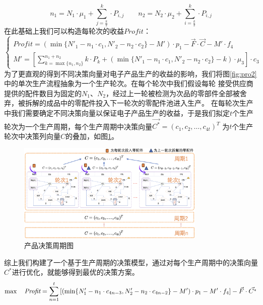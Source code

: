 \documentclass[withoutpreface,bwprint]{cumcmthesis} %
\begin{document}
\begin{equation}
	n_{1}=N_{1}\cdot \mu_{1}+\sum_{j=\frac{k}{2}}^{k}\cdot P_{i,j} \qquad
	n_{2}=N_{2}\cdot \mu_{2}+\sum_{i=\frac{k}{2}}^{k}\cdot P_{i,j}
\end{equation}
在此基础上我们可以构造每轮次的收益$Profit$：
\begin{equation}
\left\{\begin{matrix}
	 \textit{Profit}=(\min \{N'_{1}-n_{1}\cdot c_{1},N'_{2}-n_{2}\cdot c_{2}\}-M')\cdot p_{1}-\vec{F}\cdot \vec{C}-M'\cdot f_{4}\\
   	M'=[\sum_{k=\max \{n_{1},n_{2}\}}^{n_{1}+n_{2}}k\cdot P_{k} + (\min \{N'_{1}-n_{1}\cdot c_{1},N'_{2}-n_{2}\cdot c_{2}\}-k)\cdot \mu_{3}]\cdot c_{3}
	\end{matrix}\right.
	\label{eq:5}
\end{equation}
为了更直观的得到不同决策向量对电子产品生产的收益的影响，我们将图\ref{fig:pro2}中的单次生产流程抽象为一个生产轮次。在每个轮次中我们假设每轮
接受供应商提供的配件数目为固定的$N_{1}$、$N_{2}$，经过上一轮被检测为次品的零部件全部被舍弃，被拆解的成品中的零配件投入下一轮次的零配件池进入生产。
在每轮次生产中我们需要确定不同决策向量以保证电子产品生产的收益，于是我们拟定$t$个生产轮次为一个生产周期，每个生产周期中决策向量$\vec{C^{*}}=(c_{1},c_{2},\dots,c_{4t})^{T}$
为$t$个生产轮次中决策列向量$C$的叠加，如图\ref{fig:pro2-2}。
\begin{figure}[H]
	\centering
	\includegraphics[width=0.8\textwidth]{Fig/pro2-2.png}
	\caption{产品决策周期图}
	\label{fig:pro2-2}
\end{figure}
综上我们构建了一个基于生产周期的决策模型，通过对每个生产周期中的决策向量$C^{*}$进行优化，就能够得到最优的决策方案。
$$	\max \quad  \textit{Profit}=\sum_{n=1}^{t}\left [  (\min \{N'_{1}-n_{1}\cdot c_{4n-3},N'_{2}-n_{2}\cdot c_{4n-2}\}-M')\cdot p_{1}-M'\cdot f_{4} \right ] -\vec{F}\cdot \vec{C^{*}}\\$$
\end{document}
